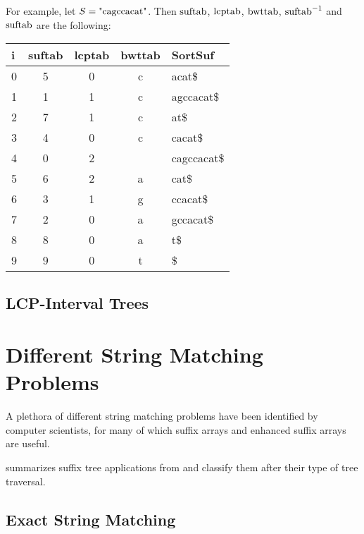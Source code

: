 \documentclass[a4paper,10pt]{article}
\begin{document}
For example, let $S=\hbox{"cagccacat"}$.  Then $\hbox{suftab}$,
$\hbox{lcptab}$, $\hbox{bwttab}$, $\hbox{suftab}^{-1}$ and
$\hbox{suftab}$ are the following:


\begin{center}
	\begin{tabular}{ | l | c | c | c | l | }
		\hline
		i & suftab & lcptab & bwttab & SortSuf \\ \hline
		0 & 5 & 0 & c & acat\$ \\ \hline
		1 & 1 & 1 & c & agccacat\$ \\ \hline
		2 & 7 & 1 & c & at\$ \\ \hline
		3 & 4 & 0 & c & cacat\$ \\ \hline
		4 & 0 & 2 &  & cagccacat\$ \\ \hline
		5 & 6 & 2 & a & cat\$ \\ \hline
		6 & 3 & 1 & g & ccacat\$ \\ \hline
		7 & 2 & 0 & a & gccacat\$ \\ \hline
		8 & 8 & 0 & a & t\$ \\ \hline
		9 & 9 & 0 & t & \$ \\ \hline
	\end{tabular}
\end{center}

\subsection*{LCP-Interval Trees}


\section*{Different String Matching Problems}

A plethora of different string matching problems have been identified
by computer scientists, for many of which suffix arrays and enhanced
suffix arrays are useful.

\citealt[pg. 2]{abouelhoda2004replacing} summarizes suffix tree applications
from \citealt[chap. 2]{gusfield1997algorithms} and classify them after their
type of tree traversal.

\subsection*{Exact String Matching}
\end{document}

